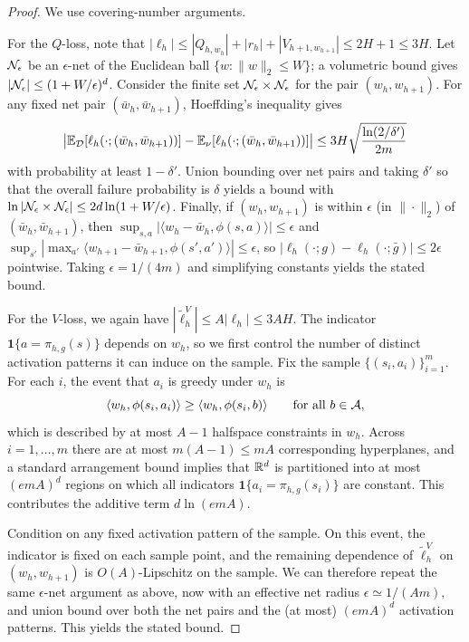 \begin{proof}
We use covering-number arguments.

For the $Q$-loss, note that $|\ell_h|\le |Q_{h,w_h}|+|r_h|+|V_{h+1,w_{h+1}}|\le 2H+1\le 3H$.
Let $\mathcal{N}_\epsilon$ be an $\epsilon$-net of the Euclidean ball $\{w:\|w\|_2\le W\}$; a volumetric bound
gives $|\mathcal{N}_\epsilon|\le (1+W/\epsilon)^d$. Consider the finite set
$\mathcal{N}_\epsilon\times\mathcal{N}_\epsilon$ for the pair $(w_h,w_{h+1})$.
For any fixed net pair $(\bar w_h,\bar w_{h+1})$, Hoeffding's inequality gives
\[
\big|\mathbb{E}_{\mathcal{D}}[\ell_h(\cdot;(\bar w_h,\bar w_{h+1}))]-\mathbb{E}_{\nu}[\ell_h(\cdot;(\bar w_h,\bar w_{h+1}))]\big|
\le
3H\sqrt{\frac{\ln(2/\delta')}{2m}}
\]
with probability at least $1-\delta'$. Union bounding over net pairs and taking $\delta'$ so that the
overall failure probability is $\delta$ yields a bound with
$\ln|\mathcal{N}_\epsilon\times\mathcal{N}_\epsilon|\le 2d\ln(1+W/\epsilon)$.
Finally, if $(w_h,w_{h+1})$ is within $\epsilon$ (in $\|\cdot\|_2$) of $(\bar w_h,\bar w_{h+1})$, then
$\sup_{s,a}|\langle w_h-\bar w_h,\phi(s,a)\rangle|\le \epsilon$ and
$\sup_{s'}|\max_{a'}\langle w_{h+1}-\bar w_{h+1},\phi(s',a')\rangle|\le \epsilon$,
so $|\ell_h(\cdot;g)-\ell_h(\cdot;\bar g)|\le 2\epsilon$ pointwise.
Taking $\epsilon=1/(4m)$ and simplifying constants yields the stated bound.

For the $V$-loss, we again have $|\tilde{\ell}_h^{V}|\le A|\ell_h|\le 3AH$.
The indicator $\mathbf{1}\{a=\pi_{h,g}(s)\}$ depends on $w_h$, so we first control the number of
distinct activation patterns it can induce on the sample.
Fix the sample $\{(s_i,a_i)\}_{i=1}^m$. For each $i$, the event that $a_i$ is greedy under $w_h$ is
\[
\langle w_h,\phi(s_i,a_i)\rangle \ge \langle w_h,\phi(s_i,b)\rangle
\qquad\text{for all } b\in\mathcal{A},
\]
which is described by at most $A-1$ halfspace constraints in $w_h$.
Across $i=1,\dots,m$ there are at most $m(A-1)\le mA$ corresponding hyperplanes, and a standard
arrangement bound implies that $\mathbb{R}^d$ is partitioned into at most $(e m A)^{d}$ regions on which all
indicators $\mathbf{1}\{a_i=\pi_{h,g}(s_i)\}$ are constant. This contributes the additive term
$d\ln(e m A)$.

Condition on any fixed activation pattern of the sample. On this event, the indicator is fixed on
each sample point, and the remaining dependence of $\tilde{\ell}_h^{V}$ on $(w_h,w_{h+1})$ is
$O(A)$-Lipschitz on the sample. We can therefore repeat the same $\epsilon$-net argument as above,
now with an effective net radius $\epsilon\simeq 1/(A m)$, and union bound over both the net pairs and
the (at most) $(e m A)^d$ activation patterns. This yields the stated bound.
\end{proof}


